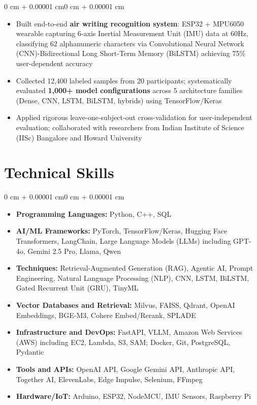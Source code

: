 \documentclass[10pt, letterpaper]{article}
\newenvironment{highlights}{
    \begin{itemize}[
        topsep=0.10 cm,
        parsep=0.10 cm,
        partopsep=0pt,
        itemsep=0pt,
        leftmargin=0 cm + 10pt
    ]
}{
    \end{itemize}
}
\newenvironment{highlightsforbulletentries}{
    \begin{itemize}[
        topsep=0.10 cm,
        parsep=0.10 cm,
        partopsep=0pt,
        itemsep=0pt,
        leftmargin=10pt
    ]
}{
    \end{itemize}
}
\newenvironment{onecolentry}{
    \begin{adjustwidth}{0 cm + 0.00001 cm}{0 cm + 0.00001 cm}
}{
    \end{adjustwidth}
}
\begin{document}
        \vspace{0.10 cm}
        \begin{onecolentry}
            \begin{highlights}
                \item Built end-to-end \textbf{air writing recognition system}: ESP32 + MPU6050 wearable capturing 6-axis Inertial Measurement Unit (IMU) data at 60Hz, classifying 62 alphanumeric characters via Convolutional Neural Network (CNN)-Bidirectional Long Short-Term Memory (BiLSTM) achieving 75\% user-dependent accuracy
                \item Collected 12,400 labeled samples from 20 participants; systematically evaluated \textbf{1,000+ model configurations} across 5 architecture families (Dense, CNN, LSTM, BiLSTM, hybrids) using TensorFlow/Keras
                \item Applied rigorous leave-one-subject-out cross-validation for user-independent evaluation; collaborated with researchers from Indian Institute of Science (IISc) Bangalore and Howard University
            \end{highlights}
        \end{onecolentry}

    \section{Technical Skills}

    \begin{onecolentry}
        \begin{highlightsforbulletentries}
            \item \textbf{Programming Languages:} Python, C++, SQL
            \item \textbf{AI/ML Frameworks:} PyTorch, TensorFlow/Keras, Hugging Face Transformers, LangChain, Large Language Models (LLMs) including GPT-4o, Gemini 2.5 Pro, Llama, Qwen
            \item \textbf{Techniques:} Retrieval-Augmented Generation (RAG), Agentic AI, Prompt Engineering, Natural Language Processing (NLP), CNN, LSTM, BiLSTM, Gated Recurrent Unit (GRU), TinyML
            \item \textbf{Vector Databases and Retrieval:} Milvus, FAISS, Qdrant, OpenAI Embeddings, BGE-M3, Cohere Embed/Rerank, SPLADE
            \item \textbf{Infrastructure and DevOps:} FastAPI, VLLM, Amazon Web Services (AWS) including EC2, Lambda, S3, SAM; Docker, Git, PostgreSQL, Pydantic
            \item \textbf{Tools and APIs:} OpenAI API, Google Gemini API, Anthropic API, Together AI, ElevenLabs, Edge Impulse, Selenium, FFmpeg
            \item \textbf{Hardware/IoT:} Arduino, ESP32, NodeMCU, IMU Sensors, Raspberry Pi
        \end{highlightsforbulletentries}
    \end{onecolentry}
\end{document}
